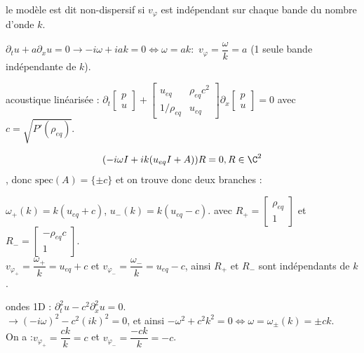 \documentclass[12pt,a4paper]{article}
\begin{document}
	\begin{ex}$ $\\
		\begin{minipage}{17cm}
			le modèle est dit non-dispersif si $v_\varphi$ est indépendant sur chaque bande du nombre d'onde $k$.
		\end{minipage}
		
		\begin{enumerate}[label=\textbullet]
			\begin{minipage}{17cm}
				\item $\partial_t u + a\partial_x u = 0 \longrightarrow -i\omega + iak = 0 \iff \omega = ak :$ $v_\varphi = \dfrac{\omega}k = a$ (1 seule bande indépendante de $k$).
				
				\item acoustique linéarisée : $\partial_t \begin{bmatrix}
					p\\
					u
				\end{bmatrix}+\begin{bmatrix}
					u_{eq} & \rho_{eq}c^2 \\
					1/\rho_{eq} & u_{eq}
				\end{bmatrix}\partial_x \begin{bmatrix}
					p \\
					u
				\end{bmatrix} = 0$ avec $c = \sqrt{P'(\rho_{eq})}$.
				
				\[
				(-i\omega I + ik(u_{eq} I + A))R = 0, R \in \C^2
				\]
				, donc $\mathrm{spec}(A) = \{\pm c\}$ et on trouve donc deux branches : 
			\end{minipage}
			
			\begin{minipage}{17cm}
				
				$\omega_+(k) = k(u_{eq}+c)$, $u_-(k) = k (u_{eq}-c)$. avec $R_+ = \begin{bmatrix}
					\rho_{eq}\\
					1
				\end{bmatrix}$ et $R_- = \begin{bmatrix}
					-\rho_{eq}c \\
					1
				\end{bmatrix}$.\\
				$v_{\varphi_+} = \dfrac{\omega_+}{k} = u_{eq}+c$ et $v_{\varphi_-} = \dfrac{\omega_-}k = u_{eq}-c$, ainsi $R_+$ et $R_-$ sont indépendants de $k$.
				
				\item ondes 1D : $\partial_t^2 u - c^2 \partial_x^2 u = 0$.\\
				$\rightarrow (-i\omega)^2-c^2(ik)^2 = 0$, et ainsi $-\omega^2 + c^2 k^2 = 0 \iff \omega = \omega_{\pm} (k) = \pm ck$.\\
				On a :$v_{\varphi_+} = \dfrac{ck}{k} = c$ et $v_{\varphi_-} = \dfrac{-ck}k = -c$.
				
			\end{minipage}
		\end{enumerate}
		
	\end{ex}
	
\end{document}
